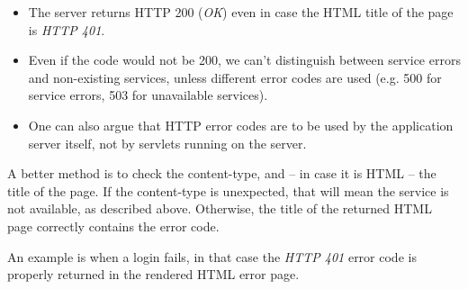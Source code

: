 \begin{itemize}
\item The server returns HTTP 200 (\emph{OK}) even in case the HTML title of the page is \emph{HTTP 401}.
\item Even if the code would not be 200, we can't distinguish between service errors and non-existing services, unless different error codes are used (e.g. 500 for service errors, 503 for unavailable services).
\item One can also argue that HTTP error codes are to be used by the application server itself, not by servlets running on the server.
\end{itemize}

A better method is to check the content-type, and -- in case it is HTML -- the
title of the page.  If the content-type is unexpected, that will mean the
service is not available, as described above. Otherwise, the title of the
returned HTML page correctly contains the error code.

An example is when a login fails, in that case the \emph{HTTP 401} error code
is properly returned in the rendered HTML error page.
